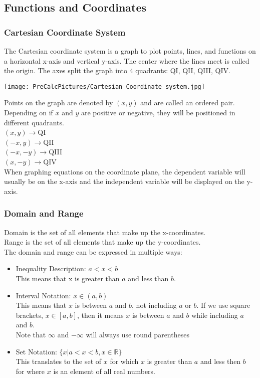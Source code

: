 \subsection{Functions and Coordinates}

\subsubsection{Cartesian Coordinate System}
The Cartesian coordinate system is a graph to plot points, lines, and functions on a horizontal x-axis and vertical y-axis. The center where the lines meet is called the origin. The axes split the graph into 4 quadrants: QI, QII, QIII, QIV.\\
\centerline{\texttt{[image: PreCalcPictures/Cartesian Coordinate system.jpg]}}
Points on the graph are denoted by $(x,y)$ and are called an ordered pair. Depending on if $x$ and $y$ are positive or negative, they will be positioned in different quadrants.\\
$(x,y)\rightarrow$QI\\
$(-x,y)\rightarrow$QII\\
$(-x,-y)\rightarrow$QIII\\
$(x,-y)\rightarrow$QIV\\
When graphing equations on the coordinate plane, the dependent variable will usually be on the x-axis and the independent variable will be displayed on the y-axis.

\subsubsection{Domain and Range}
Domain is the set of all elements that make up the x-coordinates.\\
Range is the set of all elements that make up the y-coordinates.\\
The domain and range can be expressed in multiple ways:
\begin{itemize}
    \item Inequality Description: $a<x<b$\\
    This means that x is greater than $a$ and less than $b$.
    \item Interval Notation: $x\in (a,b)$\\
    This means that $x$ is between $a$ and $b$, not including $a$ or $b$. If we use square brackets, $x\in [a,b]$, then it means $x$ is between $a$ and $b$ while including $a$ and $b$.\\
    Note that $\infty$ and $-\infty$ will always use round parentheses
    \item Set Notation: $\{x|a<x<b,x\in\mathbb{R}\}$\\
    This translates to the set of $x$ for which $x$ is greater than $a$ and less then $b$ for where $x$ is an element of all real numbers.
\end{itemize}

